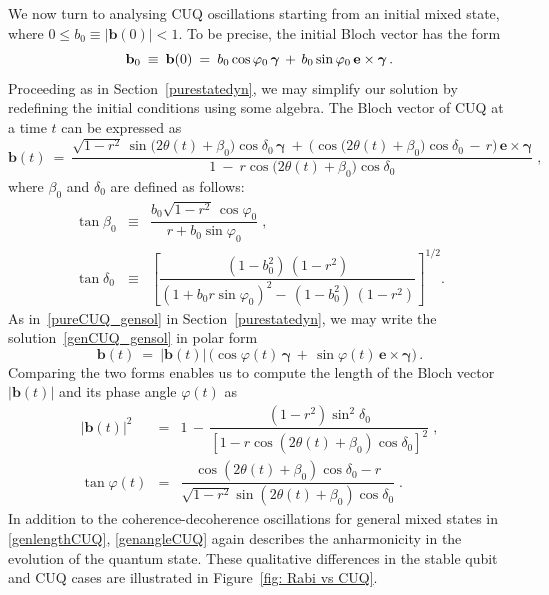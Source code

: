 \documentclass[12pt,a4paper]{article}
\begin{document}
We now turn to analysing CUQ oscillations starting from an initial mixed state, where $0\leq b_0\equiv \mathbf{|\mathbf{b}}(0)|<1$.
To be precise, the initial Bloch vector has the form
\begin{equation}
    \mathbf{b}_0\: \equiv\: {\bf b}(0)\: =\: b_0\cos{\varphi_0}\,\boldsymbol{\gamma}\, +\,b_0\sin{\varphi_0}\,\mathbf{e}\times \boldsymbol{\gamma}\,.\label{initial_genCUQ}
\end{equation}
Proceeding as in Section~\ref{purestatedyn}, we may simplify our solution by redefining the initial conditions using some algebra. The Bloch vector of CUQ at a time $t$ can be expressed as
\begin{equation}
    \mathbf{b}(t)\ =\ \dfrac{\sqrt{1-r^2}\,\sin{\big(2\theta(t)+\beta_0\big)\cos{\delta_0}}\,\boldsymbol{\gamma}\: +\: \big(\cos{\big(2\theta(t)+\beta_0\big)\cos{\delta_0}\,-\,r\big)\,\mathbf{e}\times\boldsymbol{\gamma}}}{1\: -\: r\cos{\big(2\theta(t)+\beta_0\big)}\cos{\delta_0}}\;,\label{genCUQ_gensol}
\end{equation}
where $\beta_0$ and $\delta_0$ are defined as follows:
\begin{eqnarray}
   \label{paramtrans1}
        \tan{\beta_0} \!&\equiv&\! \dfrac{b_0\sqrt{1-r^2}\,\cos{\varphi_0}}{r+b_0\sin{\varphi_0}}\;,\\
    \label{paramtrans2}
 \tan{\delta_0} \!&\equiv&\! \left[\dfrac{(1-b_0^2)\,(1-r^2)}{(1+b_0 r\sin{\varphi_0})^2 -\, (1-b_0^2)\,(1-r^2)}\right]^{1/2}.
\end{eqnarray}
As in~\eqref{pureCUQ_gensol} in Section~\ref{purestatedyn}, we may write the solution~\eqref{genCUQ_gensol} in polar form
\begin{equation}
    \mathbf{b}(t)\: =\: |\mathbf{b}(t)|\,\Big(\cos{\varphi(t)}\,\boldsymbol{\gamma}\, +\,\sin{\varphi(t)}\,\mathbf{e}\times \boldsymbol{\gamma}\Big)\label{final_genCUQ}\,.
\end{equation}
Comparing the two forms enables us to compute the length of the Bloch vector $|\mathbf{b}(t)|$ and its phase angle $\varphi(t)$
as
\begin{eqnarray}
   \label{genlengthCUQ}
    |\mathbf{b}(t)|^2 \!&=&\! 1\, -\, \dfrac{(1-r^2)\sin^2{\delta_0}}{[1-r\cos{(2\theta(t)+\beta_0)}\cos{\delta_0}]^2}\;, \\
   \label{genangleCUQ}
    \tan{\varphi(t)} \!&=&\! \dfrac{\cos{(2\theta(t)+\beta_0)\cos{\delta_0}}-r}{\sqrt{1-r^2}\sin{(2\theta(t)+\beta_0)\cos{\delta_0}}}\;.
\end{eqnarray}
In addition to the coherence-decoherence oscillations for general mixed states in \eqref{genlengthCUQ}, \eqref{genangleCUQ} again describes the anharmonicity in the evolution of the quantum state. These qualitative differences in the stable qubit and CUQ cases are illustrated in Figure~\ref{fig: Rabi vs CUQ}.
\end{document}
